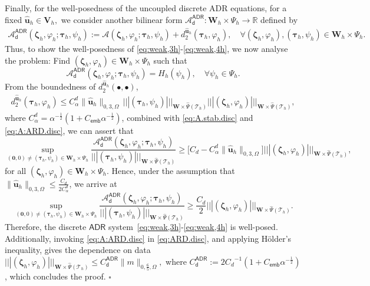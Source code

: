 \documentclass[11pt, reqno, a4paper, twoside]{article}
\newcommand*\tnorm[1]{|\!|\!| #1 |\!|\!|}
\newcommand{\bu}{\boldsymbol{u}}
\newcommand\bzeta{\boldsymbol{\zeta}}
\newcommand\bzero{\boldsymbol{0}}
\newcommand\btau{\boldsymbol{\tau}}
\newcommand{\bW}{\mathbf{W}}
\newcommand{\bV}{\mathbf{V}}
\newcommand{\cT}{\mathcal{T}}
\newenvironment{proof}{\noindent{\it Proof.}}{\hfill$\square$}
\numberwithin{equation}{section}
\numberwithin{remark}{section}
\numberwithin{figure}{section}
\numberwithin{table}{section}
\begin{document}
{{\begin{proof}
Finally, for the well-posedness of the uncoupled discrete ADR equations, for a fixed \(\hat{\bu}_h\in\bV_h,\) we consider another bilinear form \(\mathcal{A}^{\mathsf{ADR}}_{\mathsf{d}}:\bW_h\times\Psi_h\to \mathbb{R}\) defined by 
\begin{align}\label{eq:A:ARD.disc}\mathcal{A}_{\mathsf{d}}^{\mathsf{ADR}}(\bzeta_h,\varphi_h;\btau_h,\psi_h):=\mathcal{A}(\bzeta_h,\varphi_h;\btau_h,\psi_h)+d_2^{\hat{\bu}_h}(\btau_h,\varphi_h),\quad \forall (\bzeta_h,\varphi_h), (\btau_h,\psi_h)\in\bW_h\times \Psi_h.\end{align}
Thus,  to show the well-posedness of \eqref{eq:weak,3h}-\eqref{eq:weak,4h}, we now analyse  the problem: Find \((\bzeta_h,\varphi_h)\in\bW_h\times \Psi_h\) such that \[\mathcal{A}_{\mathsf{d}}^{\mathsf{ADR}}(\bzeta_h,\varphi_h;\btau_h,\psi_h)=H_h(\psi_h),\quad \forall \psi_h\in \Psi_h.\] 
From the boundedness of \(d_2^{\hat{\bu}_h}(\bullet,\bullet)\),{\begin{align}\label{eq:d2.bound.disc}d_2^{\hat{\bu}_h}(\btau_h,\varphi_h)\leq C^d_{\alpha}\|\hat{\bu}_h\|_{0,3,\Omega}\,\tnorm{(\btau_h,\psi_h)}_{\bW\times\widehat{\Psi}(\cT_h)}\tnorm{(\bzeta_h,\varphi_h)}_{\bW\times\widehat{\Psi}(\cT_h)},\end{align}} 
{where $C^d_{\alpha}=\alpha^{-\frac12}(1+{C_{\mathsf{emb}}}\alpha^{-\frac12})$}, combined with \eqref{eq:A.stab.disc} and \eqref{eq:A:ARD.disc}, we can assert that
\[\sup_{(\bzero,0)\neq(\btau_h,\psi_h)\in {\bW_h\times\Psi_h}}\frac{\mathcal{A}_{\mathsf{d}}^{\mathsf{ADR}}(\bzeta_h,\varphi_h;\btau_h,\psi_h)}{\tnorm{(\btau_h,{\psi_h})}_{\bW\times\widehat{\Psi}(\cT_h)}}\geq\bigl[C_d-C^d_{\alpha}\|\hat{\bu}_h\|_{0,3,\Omega}\bigr]\tnorm{(\bzeta_h,\varphi_h)}_ {\bW\times\widehat{\Psi}(\cT_h)}, \]
for all \((\bzeta_h,\varphi_h)\in \bW_h\times \Psi_h.\) Hence, {under the assumption that  
$\|\hat{\bu}_h\|_{0,3,\Omega}\leq \frac{C_d}{2C^d_{\alpha}}$, we} arrive at 
\begin{equation}\label{eq:ARD.disc}
\sup_{(\bzero,0)\neq(\btau_h,\psi_h)\in {\bW_h\times\Psi_h}}\frac{\mathcal{A}_{\mathsf{d}}^{\mathsf{ADR}}(\bzeta_h,\varphi_h;\btau_h,\psi_h)}{\tnorm{(\btau_h,\psi_h)}_ {\bW\times\widehat{\Psi}(\cT_h)}}\geq\frac{C_d}{2} \tnorm{(\bzeta_h,\varphi_h)}_ {\bW\times \widehat{\Psi}(\cT_h)}.
\end{equation}
Therefore, the discrete $\mathsf{ADR}$ system~\eqref{eq:weak,3h}-\eqref{eq:weak,4h} is well-posed. 
Additionally, invoking \eqref{eq:A:ARD.disc} in \eqref{eq:ARD.disc}, and  applying H\"{o}lder's inequality, 
gives the dependence on data {\(\tnorm{(\bzeta_h,\varphi_h)}_{\bW\times\widehat{\Psi}(\cT_h)}\leq C^{\mathsf{ADR}}_{\mathsf{d}}\|m\|_{0,\frac65,\Omega},\)} where {\(C^{\mathsf{ADR}}_{\mathsf{d}}:={2}{C_d}^{-1}(1+C_{\mathsf{emb}}\alpha^{-\frac12})\)}, which concludes the proof. 
\end{proof}
}
}
\end{document}
